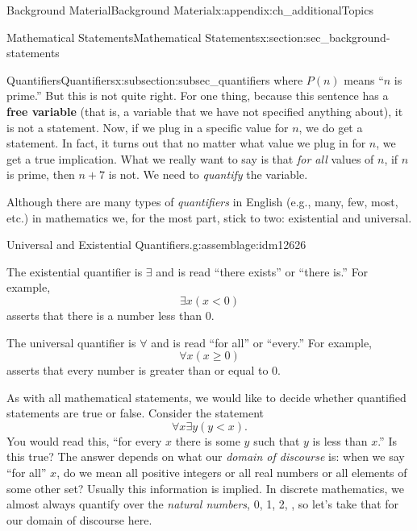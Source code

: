 \documentclass[oneside,10pt,]{book}
\newcommand{\terminology}[1]{\textbf{#1}}
\numberwithin{equation}{chapter}
\newcommand{\lt}{<}
\begin{document}
\begin{appendixptx}{Background Material}{}{Background Material}{}{}{x:appendix:ch_additionalTopics}
\begin{sectionptx}{Mathematical Statements}{}{Mathematical Statements}{}{}{x:section:sec_background-statements}
\begin{subsectionptx}{Quantifiers}{}{Quantifiers}{}{}{x:subsection:subsec_quantifiers}
where \(P(n)\) means ``\(n\) is prime.'' But this is not quite right. For one thing, because this sentence has a \terminology{free variable} (that is, a variable that we have not specified anything about), it is not a statement. Now, if we plug in a specific value for \(n\), we do get a statement. In fact, it turns out that no matter what value we plug in for \(n\), we get a true implication. What we really want to say is that \emph{for all} values of \(n\), if \(n\) is prime, then \(n+7\) is not. We need to \emph{quantify} the variable.%
\par
Although there are many types of \emph{quantifiers} in English (e.g., many, few, most, etc.) in mathematics we, for the most part, stick to two: existential and universal.%
\begin{assemblage}{Universal and Existential Quantifiers.}{g:assemblage:idm12626}%
%
\par
The existential quantifier is \(\exists\) and is read ``there exists'' or ``there is.'' For example, \label{g:notation:idm12640}%
\begin{equation*}
\exists x (x \lt 0)
\end{equation*}
asserts that there is a number less than 0.%
\par
The universal quantifier is \(\forall\) and is read ``for all'' or ``every.'' For example,  \label{g:notation:idm12653}%
\begin{equation*}
\forall x (x \ge 0)
\end{equation*}
asserts that every number is greater than or equal to 0.%
\end{assemblage}
As with all mathematical statements, we would like to decide whether quantified statements are true or false. Consider the statement%
\begin{equation*}
\forall x \exists y (y \lt x).
\end{equation*}
You would read this, ``for every \(x\) there is some \(y\) such that \(y\) is less than \(x\).'' Is this true? The answer depends on what our \emph{domain of discourse} is: when we say ``for all'' \(x\), do we mean all positive integers or all real numbers or all elements of some other set? Usually this information is implied. In discrete mathematics, we almost always quantify over the \emph{natural numbers}, 0, 1, 2, \textellipsis{}, so let's take that for our domain of discourse here.%
\par

\end{subsectionptx}
\end{sectionptx}
\end{appendixptx}
\end{document}
